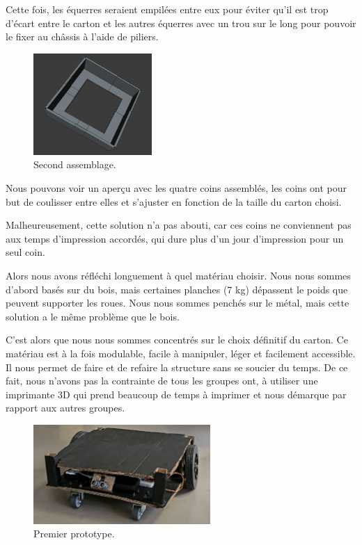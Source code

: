 \documentclass[a4paper,12pt]{report}  %
\begin{document}
Cette fois, les équerres seraient empilées entre eux pour éviter qu’il est trop d’écart entre le carton et les autres équerres avec un trou sur le long pour pouvoir le fixer au châssis à l’aide de piliers.

\begin{figure}[H]
	\centering
	\includegraphics[width=0.4\textwidth]{./attachments/cad_assemblage_v2.jpg}
	\caption{Second assemblage.}
\end{figure}

Nous pouvons voir un aperçu avec les quatre coins assemblés, les coins ont pour but de coulisser entre elles et s’ajuster en fonction de la taille du carton choisi.

Malheureusement, cette solution n’a pas abouti, car ces coins ne conviennent pas aux temps d’impression accordés, qui dure plus d’un jour d’impression pour un seul coin.

Alors nous avons réfléchi longuement à quel matériau choisir. Nous nous sommes d’abord basés sur du bois, mais certaines planches (7 kg) dépassent le poids que peuvent supporter les roues. Nous nous sommes penchés sur le métal, mais cette solution a le même problème que le bois. 

C’est alors que nous nous sommes concentrés sur le choix définitif du carton. Ce matériau est à la fois modulable, facile à manipuler, léger et facilement accessible. Il nous permet de faire et de refaire la structure sans se soucier du temps. De ce fait, nous n’avons pas la contrainte de tous les groupes ont, à utiliser une imprimante 3D qui prend beaucoup de temps à imprimer et nous démarque par rapport aux autres groupes.

\begin{figure}[H]
	\centering
	\includegraphics[width=0.6\textwidth]{./attachments/prototype_1.jpg}
	\caption{Premier prototype.}
\end{figure}
\end{document}
